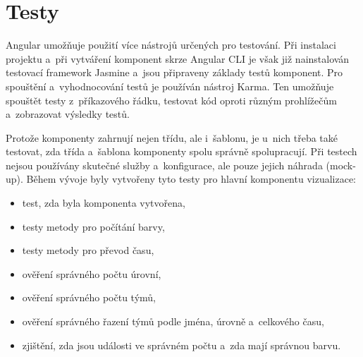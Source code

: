 \documentclass[
  digital, %
  oneside, %
  table,   %
  nolof,     %
  nolot,     %
]{fithesis3}
\begin{document}
\section{Testy}
Angular umožňuje použití více nástrojů určených pro testování. Při instalaci projektu a~při vytváření komponent skrze Angular CLI je však již nainstalován testovací framework Jasmine a~jsou připraveny základy testů komponent. Pro spouštění a~vyhodnocování testů je používán nástroj Karma. Ten umožňuje spouštět testy z~příkazového řádku, testovat kód oproti různým prohlížečům a~zobrazovat výsledky testů.\par
Protože komponenty zahrnují nejen třídu, ale i~šablonu, je u~nich třeba také testovat, zda třída a~šablona komponenty spolu správně spolupracují. Při testech nejsou používány skutečné služby a~konfigurace, ale pouze jejich náhrada (mock-up). Během vývoje byly vytvořeny tyto testy pro hlavní komponentu vizualizace:
\begin{itemize}
  \item test, zda byla komponenta vytvořena,
  \item testy metody pro počítání barvy,
  \item testy metody pro převod času,
  \item ověření správného počtu úrovní,
  \item ověření správného počtu týmů,
  \item ověření správného řazení týmů podle jména, úrovně a~celkového času,
  \item zjištění, zda jsou události ve správném počtu a~zda mají správnou barvu.
\end{itemize}
\end{document}

